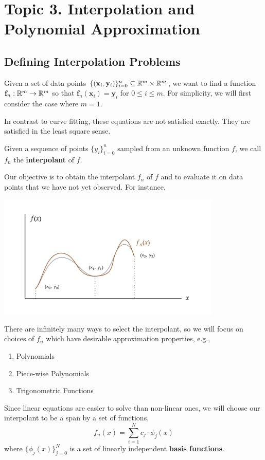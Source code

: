 \section{Topic 3. Interpolation and Polynomial Approximation}
\subsection{Defining Interpolation Problems}
Given a set of data points $\{(\mathbf{x}_i, \mathbf{y}_i)\}^n_{i=0} \subseteq \mathbb{R}^m \times \mathbb{R}^m$, we want to find a function $\mathbf{f}_n : \mathbb{R}^m \rightarrow \mathbb{R}^m$ so that $\mathbf{f}_n(\mathbf{x}_i) = \mathbf{y}_i$ for $0 \leq i \leq m$. For simplicity, we will first consider the case where $m = 1$.

\begin{marginfigure}
    In contrast to curve fitting, these equations are not satisfied exactly. They are satisfied in the least square sense.
\end{marginfigure}

\NewLine

\begin{defn}[Interpolant]
    Given a sequence of points $\{y_i\}_{i=0}^n$ sampled from an unknown function $f$, we call $f_n$ the \textbf{interpolant} of $f$.
\end{defn}

\NewLine

\noindent Our objective is to obtain the interpolant $f_n$ of $f$ and to evaluate it on data points that we have not yet observed. For instance,

\begin{center}
       \includegraphics[width=0.8\textwidth]{figures/fig-4.png}
\end{center}

\begin{marginfigure}
    There are infinitely many ways to select the interpolant, so we will focus on choices of $f_n$ which have desirable approximation properties, e.g.,
    \begin{enumerate}
        \item Polynomials
        \item Piece-wise Polynomials
        \item Trigonometric Functions
    \end{enumerate}
\end{marginfigure}
\noindent  Since linear equations are easier to solve than non-linear ones, we will choose our interpolant to be a span by a set of functions,
\[f_n(x) = \sum_{i=1}^N c_j \cdot \phi_j(x)\]
where $\{\phi_j(x)\}_{j = 0}^N$ is a set of linearly independent \textbf{basis functions}.

